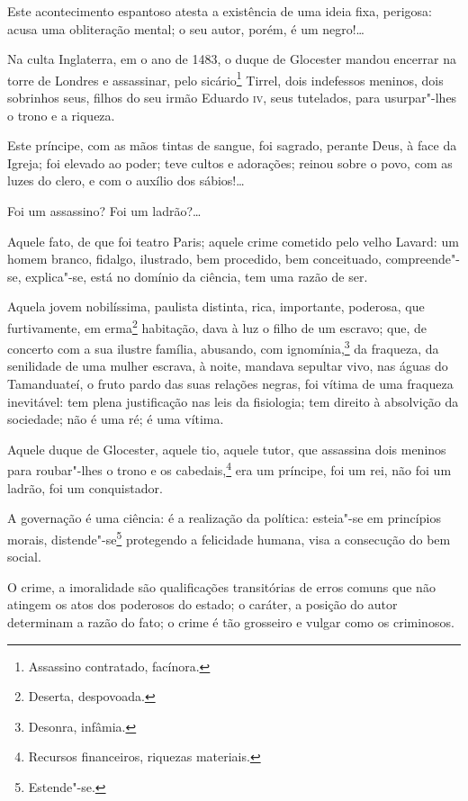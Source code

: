Este acontecimento espantoso atesta a existência de uma ideia fixa,
perigosa: acusa uma obliteração mental; o seu autor, porém, é um
negro!\ldots{}

\asterisc

Na culta Inglaterra, em o ano de 1483, o duque de Glocester mandou
encerrar na torre de Londres e assassinar, pelo sicário\footnote{
  Assassino contratado, facínora.} Tirrel, dois indefessos meninos, dois
sobrinhos seus, filhos do seu irmão Eduardo \textsc{iv}, seus tutelados, para
usurpar"-lhes o trono e a riqueza.

Este príncipe, com as mãos tintas de sangue, foi sagrado, perante Deus,
à face da Igreja; foi elevado ao poder; teve cultos e adorações; reinou
sobre o povo, com as luzes do clero, e com o auxílio dos sábios!\ldots{}

Foi um assassino? Foi um ladrão?\ldots{}

\asterisc

Aquele fato, de que foi teatro Paris; aquele crime cometido pelo velho
Lavard: um homem branco, fidalgo, ilustrado, bem procedido, bem
conceituado, compreende"-se, explica"-se, está no domínio da ciência, tem
uma razão de ser.

Aquela jovem nobilíssima, paulista distinta, rica, importante, poderosa,
que furtivamente, em erma\footnote{Deserta, despovoada.} habitação,
dava à luz o filho de um escravo; que, de concerto com a sua ilustre
família, abusando, com ignomínia,\footnote{Desonra, infâmia.} da
fraqueza, da senilidade de uma mulher escrava, à noite, mandava sepultar
vivo, nas águas do Tamanduateí, o fruto pardo das suas relações negras,
foi vítima de uma fraqueza inevitável: tem plena justificação nas leis
da fisiologia; tem direito à absolvição da sociedade; não é uma ré; é
uma vítima.

Aquele duque de Glocester, aquele tio, aquele tutor, que assassina dois
meninos para roubar"-lhes o trono e os cabedais,\footnote{Recursos
  financeiros, riquezas materiais.} era um príncipe, foi um rei, não
foi um ladrão, foi um conquistador.

A governação é uma ciência: é a realização da política: esteia"-se em
princípios morais, distende"-se\footnote{Estende"-se.} protegendo a
felicidade humana, visa a consecução do bem social.

O crime, a imoralidade são qualificações transitórias de erros comuns
que não atingem os atos dos poderosos do estado; o caráter, a posição do
autor determinam a razão do fato; o crime é tão grosseiro e vulgar como
os criminosos.


